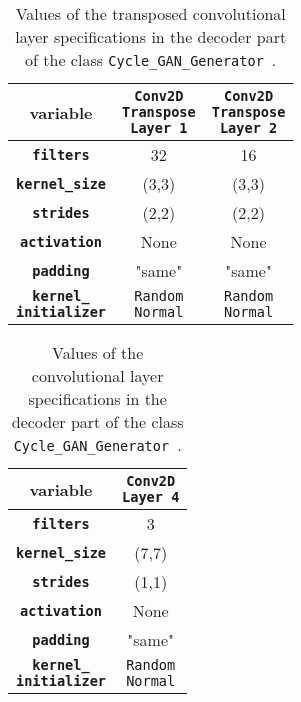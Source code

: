 \documentclass[fleqn,10pt]{SelfArx} %
\begin{document}
\begin{table}[htb]
\centering
\caption{Values of the transposed convolutional layer specifications in the decoder part of the class \texttt{Cycle\_GAN\_Generator}~\cite{image-to-image-ccan}.}
\label{tab:decoderValues1}
\begin{tabular}{c c c}
\textbf{variable} & \makecell[cc]{\textbf{\texttt{Conv2D}} \\ \textbf{\texttt{Transpose}} \\ \textbf{\texttt{Layer 1}}} & \makecell[cc]{\textbf{\texttt{Conv2D}} \\ \textbf{\texttt{Transpose}} \\ \textbf{\texttt{Layer 2}}} \\ \hline
\textbf{\texttt{filters}} & 32 & 16 \\ \hline
\textbf{\texttt{kernel\_size}} & (3,3) & (3,3)  \\ \hline
\textbf{\texttt{strides}} & (2,2) & (2,2)  \\ \hline
\textbf{\texttt{activation}} & None & None  \\ \hline 
\textbf{\texttt{padding}} & "same" & "same" \\ \hline
\makecell[cc]{\textbf{\texttt{kernel\_}} \\ \textbf{\texttt{initializer}}} & \makecell[cc]{\texttt{Random} \\ \texttt{Normal}} & \makecell[cc]{\texttt{Random} \\ \texttt{Normal}}  \\ \hline
\end{tabular}
\end{table}

\begin{table}[htb]
\centering
\caption{Values of the convolutional layer specifications in the decoder part of the class \texttt{Cycle\_GAN\_Generator}~\cite{image-to-image-ccan}.}
\label{tab:decoderValues2}
\begin{tabular}{c c}
\textbf{variable} & \makecell[cc]{\textbf{\texttt{Conv2D}} \\ \textbf{\texttt{Layer 4}}} \\ \hline
\textbf{\texttt{filters}} & 3 \\ \hline
\textbf{\texttt{kernel\_size}} & (7,7) \\ \hline
\textbf{\texttt{strides}} & (1,1) \\ \hline
\textbf{\texttt{activation}} & None \\ \hline 
\textbf{\texttt{padding}} & "same" \\ \hline
\makecell[cc]{\textbf{\texttt{kernel\_}} \\ \textbf{\texttt{initializer}}} & \makecell[cc]{\texttt{Random} \\ \texttt{Normal}} \\ \hline
\end{tabular}
\end{table}
\end{document}
